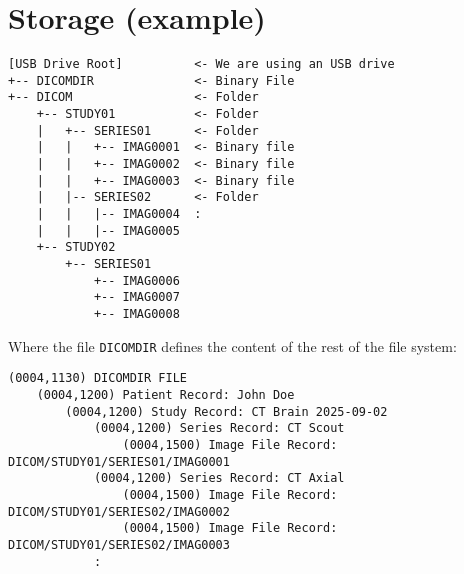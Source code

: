 \section{Storage (example)}
\begin{verbatim}
[USB Drive Root]          <- We are using an USB drive
+-- DICOMDIR              <- Binary File
+-- DICOM                 <- Folder
    +-- STUDY01           <- Folder
    |   +-- SERIES01      <- Folder
    |   |   +-- IMAG0001  <- Binary file
    |   |   +-- IMAG0002  <- Binary file
    |   |   +-- IMAG0003  <- Binary file
    |   |-- SERIES02      <- Folder
    |   |   |-- IMAG0004  :
    |   |   |-- IMAG0005
    +-- STUDY02
        +-- SERIES01
            +-- IMAG0006
            +-- IMAG0007
            +-- IMAG0008
\end{verbatim}

Where the file \texttt{DICOMDIR} defines the content of the rest of the file system:
\begin{verbatim}
(0004,1130) DICOMDIR FILE
    (0004,1200) Patient Record: John Doe
        (0004,1200) Study Record: CT Brain 2025-09-02
            (0004,1200) Series Record: CT Scout
                (0004,1500) Image File Record: DICOM/STUDY01/SERIES01/IMAG0001
            (0004,1200) Series Record: CT Axial
                (0004,1500) Image File Record: DICOM/STUDY01/SERIES02/IMAG0002
                (0004,1500) Image File Record: DICOM/STUDY01/SERIES02/IMAG0003
            :
\end{verbatim}
